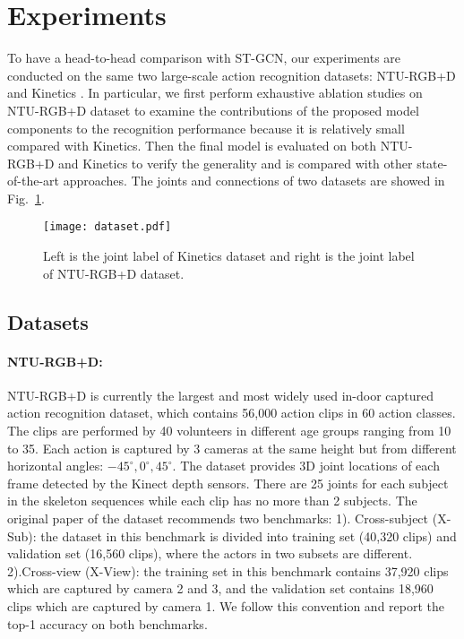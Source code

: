 \documentclass[10pt,twocolumn,letterpaper]{article}
\begin{document}
	\section{Experiments}
    To have a head-to-head comparison with ST-GCN, our experiments are conducted on the same two large-scale action recognition datasets: NTU-RGB+D \cite{shahroudy_ntu_2016} and Kinetics \cite{kay_kinetics_2017}. In particular, we first perform exhaustive ablation studies on NTU-RGB+D dataset to examine the contributions of the proposed model components to the recognition performance because it is relatively small compared with Kinetics. Then the final model is evaluated on both NTU-RGB+D and Kinetics to verify the generality and is compared with other state-of-the-art approaches. The joints and connections of two datasets are showed in Fig.~\ref{fig:dataset}.
    
	\begin{figure}[!htb]
	\begin{center}
	\texttt{[image: dataset.pdf]}
	\caption{Left is the joint label of Kinetics dataset and right is the joint label of NTU-RGB+D dataset.}
	\label{fig:dataset}	
	\end{center}
	\end{figure}

    \subsection{Datasets}
    \paragraph{NTU-RGB+D:} NTU-RGB+D \cite{shahroudy_ntu_2016} is currently the largest and most widely used in-door captured action recognition dataset, which contains 56,000 action clips in 60 action classes. The clips are performed by 40 volunteers in different age groups ranging from 10 to 35. Each action is captured by 3 cameras at the same height but from different horizontal angles: $-45^\circ, 0^\circ, 45^\circ$. The dataset provides 3D joint locations of each frame detected by the Kinect depth sensors. There are 25 joints for each subject in the skeleton sequences while each clip has no more than 2 subjects. The original paper \cite{shahroudy_ntu_2016} of the dataset recommends two benchmarks: 
    1). Cross-subject (X-Sub): the dataset in this benchmark is divided into training set (40,320 clips) and validation set (16,560 clips), where the actors in two subsets are different.
    2).Cross-view (X-View): the training set in this benchmark contains 37,920 clips which are captured by camera 2 and 3, and the validation set contains 18,960 clips which are captured by camera 1.
    We follow this convention and report the top-1 accuracy on both benchmarks.
    
\end{document}
